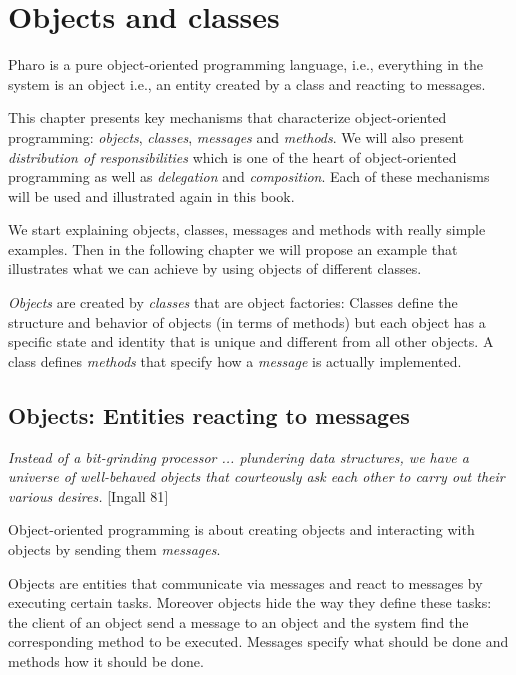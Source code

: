 \documentclass[10pt,twoside,english]{_support/latex/sbabook/sbabook}
\begin{document}
\frontmatter
\pagestyle{plain}

\tableofcontents*
\clearpage\listoffigures

\mainmatter

\chapter{Objects and classes}\label{cha:objectclass}
Pharo is a pure object-oriented programming language, i.e., everything in the system is an object i.e., an entity created by a class and reacting to messages.

This chapter presents key mechanisms that characterize object-oriented programming: \textit{objects}, \textit{classes},  \textit{messages} and \textit{methods}. We will also present \textit{distribution of responsibilities} which is one of the heart of object-oriented programming as well as \textit{delegation} and \textit{composition}. Each of these mechanisms will be used and illustrated again in this book.

We start explaining objects, classes, messages and methods with really simple examples. Then in the following chapter we will propose an example that illustrates what we can achieve by using objects of different classes. 

\textit{Objects} are created by \textit{classes} that are object factories: Classes define the structure and behavior of objects (in terms of methods) but each object has a specific state and identity that is unique and different from all other objects. A class defines \textit{methods} that specify how a \textit{message} is actually implemented. 
\section{Objects: Entities reacting to messages}
\textit{Instead of a bit-grinding processor ... plundering data structures, we have a universe of well-behaved objects that courteously ask each other to carry out their various desires.} {[}Ingall 81{]}

Object-oriented programming is about creating objects and interacting with objects by sending them \textit{messages}.

Objects are entities that communicate via messages and react to messages by executing certain tasks. Moreover objects hide the way they define these tasks: the client of an object send a message to an object and the system find the corresponding method to be executed. Messages specify what should be done and methods how it should be done. 
\end{document}
